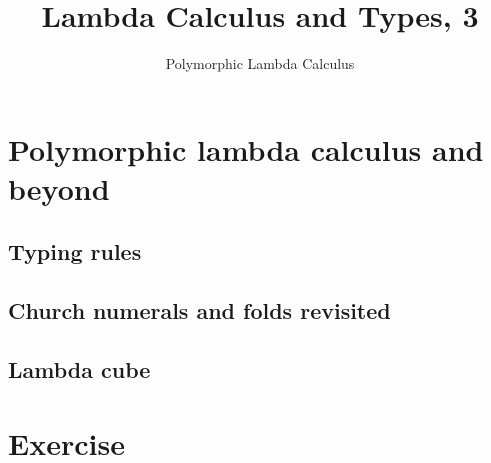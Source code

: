 \title{Lambda Calculus and Types, 3}
\subtitle{Polymorphic Lambda Calculus}

\begin{frame}
\maketitle
\end{frame}

\section{Polymorphic lambda calculus and beyond}
\subsection{Typing rules}
\subsection{Church numerals and folds revisited}
\subsection{Lambda cube}
\section*{Exercise}



